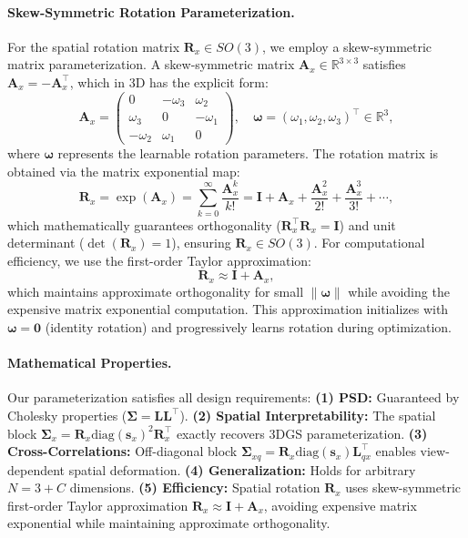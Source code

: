 \documentclass{article} %
\begin{document}
\paragraph{Skew-Symmetric Rotation Parameterization.}
For the spatial rotation matrix $\bm{R}_x \in SO(3)$, we employ a skew-symmetric matrix parameterization. A skew-symmetric matrix $\bm{A}_x \in \mathbb{R}^{3 \times 3}$ satisfies $\bm{A}_x = -\bm{A}_x^\top$, which in 3D has the explicit form:
\begin{equation}
\bm{A}_x = \begin{pmatrix} 0 & -\omega_3 & \omega_2 \\ \omega_3 & 0 & -\omega_1 \\ -\omega_2 & \omega_1 & 0 \end{pmatrix}, \quad \bm{\omega} = (\omega_1, \omega_2, \omega_3)^\top \in \mathbb{R}^3,
\end{equation}
where $\bm{\omega}$ represents the learnable rotation parameters. The rotation matrix is obtained via the matrix exponential map:
\begin{equation}
\bm{R}_x = \exp(\bm{A}_x) = \sum_{k=0}^{\infty} \frac{\bm{A}_x^k}{k!} = \bm{I} + \bm{A}_x + \frac{\bm{A}_x^2}{2!} + \frac{\bm{A}_x^3}{3!} + \cdots,
\end{equation}
which mathematically guarantees orthogonality ($\bm{R}_x^\top \bm{R}_x = \bm{I}$) and unit determinant ($\det(\bm{R}_x) = 1$), ensuring $\bm{R}_x \in SO(3)$. For computational efficiency, we use the first-order Taylor approximation:
\begin{equation}
\bm{R}_x \approx \bm{I} + \bm{A}_x,
\end{equation}
which maintains approximate orthogonality for small $\|\bm{\omega}\|$ while avoiding the expensive matrix exponential computation. This approximation initializes with $\bm{\omega} = \bm{0}$ (identity rotation) and progressively learns rotation during optimization.

\paragraph{Mathematical Properties.}
Our parameterization satisfies all design requirements: \textbf{(1) PSD:} Guaranteed by Cholesky properties ($\bm{\Sigma} = \bm{L}\bm{L}^\top$). \textbf{(2) Spatial Interpretability:} The spatial block $\bm{\Sigma}_x = \bm{R}_x \text{diag}(\bm{s}_x)^2 \bm{R}_x^\top$ exactly recovers 3DGS parameterization. \textbf{(3) Cross-Correlations:} Off-diagonal block $\bm{\Sigma}_{xq} = \bm{R}_x \text{diag}(\bm{s}_x) \bm{L}_{qx}^\top$ enables view-dependent spatial deformation. \textbf{(4) Generalization:} Holds for arbitrary $N = 3 + C$ dimensions. \textbf{(5) Efficiency:} Spatial rotation $\bm{R}_x$ uses skew-symmetric first-order Taylor approximation $\bm{R}_x \approx \bm{I} + \bm{A}_x$, avoiding expensive matrix exponential while maintaining approximate orthogonality.
\end{document}
